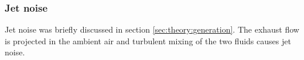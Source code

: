 \subsubsection{Jet noise}
Jet noise was briefly discussed in section \ref{sec:theory:generation}. The
exhaust flow is projected in the ambient air and turbulent mixing of the two
fluids causes jet noise.









%
%
%
%
%
%
%
%
